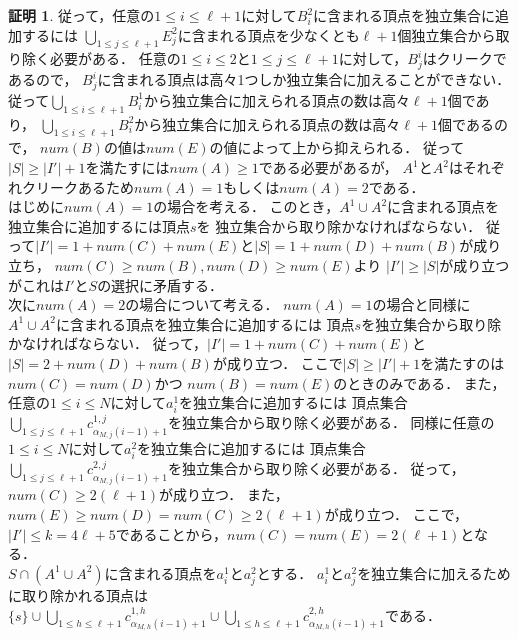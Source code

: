 \documentclass[11pt,a4paper]{jarticle}
\theoremstyle{definition}
\newtheorem*{prf*}{証明}
\begin{document}
\begin{prf*}
従って，任意の$1\leq i \leq \ell+1$に対して$B^{2}_{i}$に含まれる頂点を独立集合に追加するには
$\bigcup_{1\leq j \leq \ell+1}E^{2}_{j}$に含まれる頂点を少なくとも$\ell+1$個独立集合から取り除く必要がある．
任意の$1\leq i \leq 2$と$1\leq j \leq \ell+1$に対して，$B^{i}_{j}$はクリークであるので，
$B^{i}_{j}$に含まれる頂点は高々1つしか独立集合に加えることができない．
従って$\bigcup_{1\leq i \leq \ell+1}B^{1}_{i}$から独立集合に加えられる頂点の数は高々$\ell+1$個であり，
$\bigcup_{1\leq i \leq \ell+1}B^{2}_{i}$から独立集合に加えられる頂点の数は高々$\ell+1$個であるので，
$\mathit{num}(B)$の値は$\mathit{num}(E)$の値によって上から抑えられる．
従って$|S|\geq |I'|+1$を満たすには$\mathit{num}(A) \geq 1$である必要があるが，
$A^{1}$と$A^{2}$はそれぞれクリークあるため$\mathit{num}(A) = 1$もしくは$\mathit{num}(A) = 2$である．\\
はじめに$\mathit{num}(A)=1$の場合を考える．
このとき，$A^{1} \cup A^{2}$に含まれる頂点を独立集合に追加するには頂点$s$を
独立集合から取り除かなければならない．
従って$|I'|=1+\mathit{num}(C)+\mathit{num}(E)$と$|S|=1+\mathit{num}(D)+\mathit{num}(B)$が成り立ち，
$\mathit{num}(C)\geq \mathit{num}(B), \mathit{num}(D)\geq \mathit{num}(E)$より
$|I'|\geq |S|$が成り立つがこれは$I'$と$S$の選択に矛盾する．\\
次に$\mathit{num}(A)=2$の場合について考える．
$\mathit{num}(A)=1$の場合と同様に$A^{1} \cup A^{2}$に含まれる頂点を独立集合に追加するには
頂点$s$を独立集合から取り除かなければならない．
従って，$|I'|=1+\mathit{num}(C)+\mathit{num}(E)$と$|S|=2+\mathit{num}(D)+\mathit{num}(B)$が成り立つ．
ここで$|S| \geq |I'|+1$を満たすのは$\mathit{num}(C)=\mathit{num}(D)$かつ
$\mathit{num}(B)=\mathit{num}(E)$のときのみである．
また，任意の$1\leq i \leq N$に対して$a^{1}_{i}$を独立集合に追加するには
頂点集合$\bigcup_{1\leq j \leq \ell+1} c^{1,j}_{\alpha_{M,j}(i-1)+1}$を独立集合から取り除く必要がある．
同様に任意の$1\leq i \leq N$に対して$a^{2}_{i}$を独立集合に追加するには
頂点集合$\bigcup_{1\leq j \leq \ell+1} c^{2,j}_{\alpha_{M,j}(i-1)+1}$を独立集合から取り除く必要がある．
従って，$\mathit{num}(C) \geq 2 (\ell+1)$が成り立つ．
また，$\mathit{num}(E)\geq \mathit{num}(D)=\mathit{num}(C) \geq 2(\ell+1)$が成り立つ．
ここで，$|I'|\leq k=4\ell+5$であることから，$\mathit{num}(C)=\mathit{num}(E)=2(\ell+1)$となる． \\
$S \cap (A^{1}\cup A^{2})$に含まれる頂点を$a^{1}_{i}$と$a^{2}_{j}$とする．
$a^{1}_{i}$と$a^{2}_{j}$を独立集合に加えるために取り除かれる頂点は
$\{s\} \cup \bigcup_{1\leq h \leq \ell+1} c^{1,h}_{\alpha_{M,h}(i-1)+1} \cup 
\bigcup_{1\leq h \leq \ell+1} c^{2,h}_{\alpha_{M,h}(i-1)+1}$である．

\end{prf*}
\end{document}
